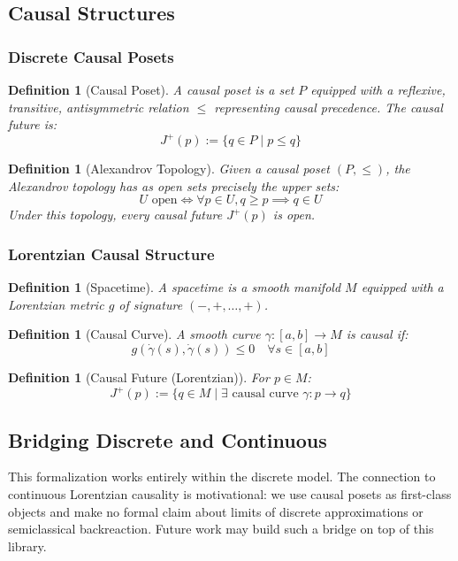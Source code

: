 \documentclass[12pt]{article}
\newtheorem{definition}[theorem]{Definition}
\begin{document}
\subsection{Causal Structures}

\subsubsection{Discrete Causal Posets}

\begin{definition}[Causal Poset]
A causal poset is a set $P$ equipped with a reflexive, transitive, antisymmetric relation $\leq$ representing causal precedence. The causal future is:
\[
J^+(p) := \{q \in P \mid p \leq q\}
\]
\end{definition}

\begin{definition}[Alexandrov Topology]
Given a causal poset $(P, \leq)$, the Alexandrov topology has as open sets precisely the upper sets:
\[
U \text{ open} \iff \forall p \in U, q \geq p \implies q \in U
\]
Under this topology, every causal future $J^+(p)$ is open.
\end{definition}

\subsubsection{Lorentzian Causal Structure}

\begin{definition}[Spacetime]
A spacetime is a smooth manifold $M$ equipped with a Lorentzian metric $g$ of signature $(-,+,\ldots,+)$.
\end{definition}

\begin{definition}[Causal Curve]
A smooth curve $\gamma : [a,b] \to M$ is causal if:
\[
g(\dot{\gamma}(s), \dot{\gamma}(s)) \leq 0 \quad \forall s \in [a,b]
\]
\end{definition}

\begin{definition}[Causal Future (Lorentzian)]
For $p \in M$:
\[
J^+(p) := \{q \in M \mid \exists \text{ causal curve } \gamma : p \to q\}
\]
\end{definition}

\subsection{Bridging Discrete and Continuous}

This formalization works entirely within the discrete model.  The connection
to continuous Lorentzian causality is motivational: we use causal posets as
first-class objects and make no formal claim about limits of discrete
approximations or semiclassical backreaction.  Future work may build such a
bridge on top of this library.
\end{document}
